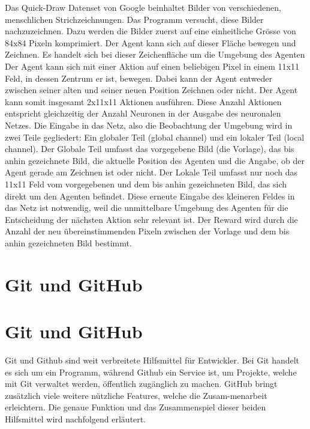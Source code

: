 Das Quick-Draw Datenset von Google beinhaltet Bilder von verschiedenen,
menschlichen Strichzeichnungen. Das Programm versucht, diese Bilder
nachzuzeichnen. Dazu werden die Bilder zuerst auf eine einheitliche Grösse von
84x84 Pixeln komprimiert. Der Agent kann sich auf dieser Fläche bewegen und
Zeichnen. Es handelt sich bei dieser Zeichenfläche um die Umgebung des Agenten
Der Agent kann sich mit einer Aktion auf einen beliebigen Pixel in einem 11x11
Feld, in dessen Zentrum er ist, bewegen. Dabei kann der Agent entweder zwischen
seiner alten und seiner neuen Position Zeichnen oder nicht. Der Agent kann somit
insgesamt 2x11x11 Aktionen ausführen. Diese Anzahl Aktionen entspricht
gleichzeitig der Anzahl Neuronen in der Ausgabe des neuronalen Netzes. Die
Eingabe in das Netz, also die Beobachtung der Umgebung wird in zwei Teile
gegliedert: Ein globaler Teil (global channel) und ein lokaler Teil (local
channel). Der Globale Teil umfasst das vorgegebene Bild (die Vorlage), das bis
anhin gezeichnete Bild, die aktuelle Position des Agenten und die Angabe, ob der
Agent gerade am Zeichnen ist oder nicht. Der Lokale Teil umfasst nur noch das
11x11 Feld vom vorgegebenen und dem bis anhin gezeichneten Bild, das sich direkt
um den Agenten befindet. Diese erneute Eingabe des kleineren Feldes in das Netz
ist notwendig, weil die unmittelbare Umgebung des Agenten für die Entscheidung
der nächsten Aktion sehr relevant ist. Der Reward wird durch die Anzahl der neu
übereinstimmenden Pixeln zwischen der Vorlage und dem bis anhin
gezeichneten Bild bestimmt. 











\section{Git und GitHub}
\label{chap:t_git}

\section{Git und GitHub}
\label{chap:git_github}
Git und Github sind weit verbreitete Hilfsmittel für Entwickler. Bei Git handelt
es sich um ein Programm, während Github ein Service ist, um Projekte, welche mit
Git verwaltet werden, öffentlich zugänglich zu machen. GitHub bringt zusätzlich
viele weitere nützliche Features, welche die Zusam\hyp{}menarbeit erleichtern. Die
genaue Funktion und das Zusammenspiel dieser beiden Hilfsmittel wird nachfolgend
erläutert.

